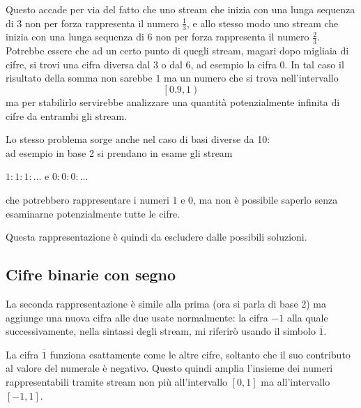 \documentclass[Lau,oneside]{sapthesis}
\begin{document}
Questo accade per via del fatto che uno stream che inizia con una lunga sequenza 
di 3 non per forza rappresenta il numero $\frac{1}{3}$, e allo stesso modo uno 
stream che inizia con una lunga sequenza di 6 non per forza rappresenta il 
numero $\frac{2}{3}$. Potrebbe essere che 
ad un certo punto di quegli stream, magari dopo migliaia di cifre, si trovi una 
cifra diversa dal 3 o dal 6, ad esempio la cifra 0. In tal caso il risultato 
della somma 
non sarebbe $1$ ma un numero che si trova nell'intervallo
$$\left[0.9,1\right)$$
ma per stabilirlo servirebbe analizzare una quantità potenzialmente infinita di 
cifre da entrambi gli stream.

\medskip

Lo stesso problema sorge anche nel caso di basi diverse da 10:\\
ad esempio in base 2 si prendano in esame gli stream
\begin{center}
$1:1:1:\ldots$ \hspace{0.5cm} e \hspace{0.5cm} $0:0:0:\ldots$
\end{center}
che potrebbero rappresentare i numeri $1$ e $0$, ma non è possibile saperlo 
senza esaminarne potenzialmente tutte le cifre.

\medskip

Questa rappresentazione è quindi da escludere dalle possibili soluzioni.


\subsection{Cifre binarie con segno}
La seconda rappresentazione \cite{DavePlume} è simile alla prima (ora si parla di base 2) ma 
aggiunge una nuova cifra alle due usate normalmente: la cifra $-1$ alla quale 
successivamente, nella 
sintassi degli stream, mi riferirò usando il simbolo $\overline{1}$.

La cifra $\overline{1}$ funziona esattamente come le altre cifre, soltanto che 
il suo contributo al valore del numerale è negativo. Questo quindi amplia 
l'insieme dei numeri rappresentabili tramite stream non più all'intervallo 
$\left[0,1\right]$ ma all'intervallo $\left[-1,1\right]$.
\end{document}
